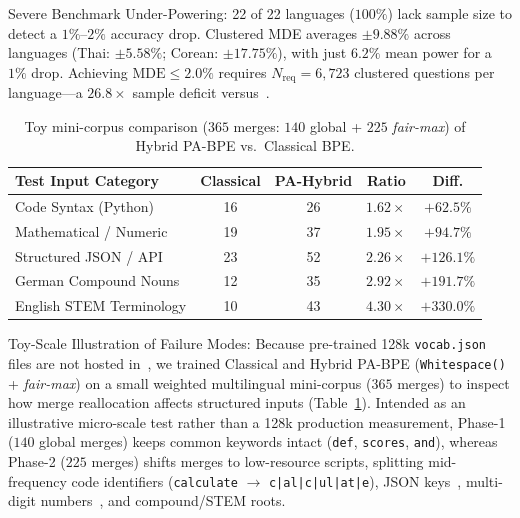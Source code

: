 \documentclass[sigconf,nonacm]{acmart}
\begin{document}
{Severe Benchmark Under-Powering:} {22 of 22 languages ($100\%$)} lack sample size to detect a $1\%$--$2\%$ accuracy drop. Clustered MDE averages ${\pm 9.88\%}$ across languages (Thai: $\pm 5.58\%$; Corean: $\pm 17.75\%$), with just $6.2\%$ mean power for a $1\%$ drop. Achieving $\mathrm{MDE} \le 2.0\%$ requires $N_{\mathrm{req}} = 6{,}723$ clustered questions per language---a ${26.8\times}$ sample deficit versus~\cite{foroutan2026parity}.

\begin{table}[t]
\centering
\caption{Toy mini-corpus comparison ($365$ merges: $140$ global + $225$ \textit{fair-max}) of Hybrid PA-BPE vs.\ Classical BPE.}
\vspace{-0.4em}
\footnotesize
\setlength{\tabcolsep}{3.5pt}
\begin{tabular}{lcccc}
\toprule
\textbf{Test Input Category} & \textbf{Classical} & \textbf{PA-Hybrid} & \textbf{Ratio} & \textbf{Diff.} \\
\midrule
Code Syntax (Python)       & 16 & 26 & $1.62\times$ & $+62.5\%$  \\
Mathematical / Numeric     & 19 & 37 & $1.95\times$ & $+94.7\%$  \\
Structured JSON / API      & 23 & 52 & $2.26\times$ & $+126.1\%$ \\
German Compound Nouns      & 12 & 35 & $2.92\times$ & $+191.7\%$ \\
English STEM Terminology   & 10 & 43 & $4.30\times$ & $+330.0\%$ \\
\bottomrule
\end{tabular}
\vspace{-0.5em}
\label{tab:failure_modes}
\end{table}

{Toy-Scale Illustration of Failure Modes:} Because pre-trained 128k \texttt{vocab.json} files are not hosted in~\cite{foroutan2026parity}, we trained Classical and Hybrid PA-BPE (\texttt{Whitespace()} + \textit{fair-max}) on a small weighted multilingual mini-corpus ($365$ merges) to inspect how merge reallocation affects structured inputs (Table~\ref{tab:failure_modes}). Intended as an illustrative micro-scale test rather than a 128k production measurement, Phase-1 ($140$ global merges) keeps common keywords intact (\texttt{def}, \texttt{scores}, \texttt{and}), whereas Phase-2 ($225$ merges) shifts merges to low-resource scripts, splitting mid-frequency code identifiers (\texttt{calculate} $\rightarrow$ \texttt{c|al|c|ul|at|e}), JSON keys~\cite{petrov2023language,ahia2023all}, multi-digit numbers~\cite{singh2024tokenization}, and compound/STEM roots.
\end{document}
